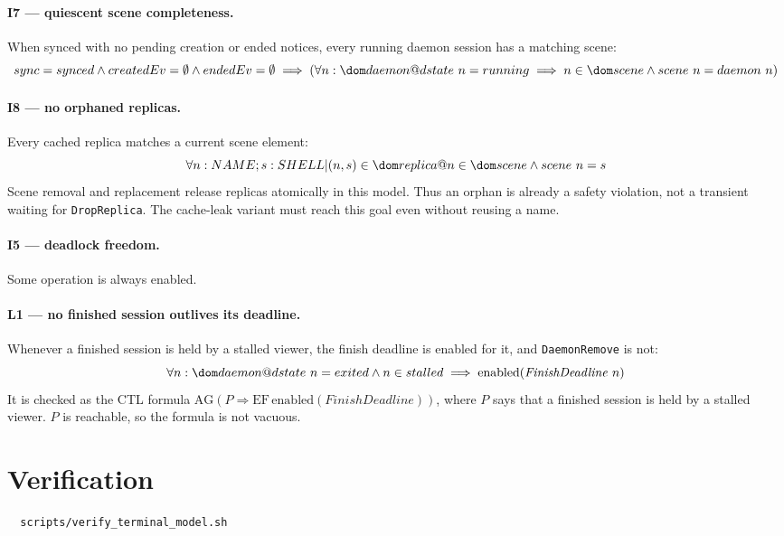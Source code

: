 \documentclass[a4paper,10pt,fleqn]{article}
\begin{document}
\paragraph{I7 --- quiescent scene completeness.}
When synced with no pending creation or ended notices, every running daemon
session has a matching scene:
\[
  sync = synced \land createdEv = \emptyset \land endedEv = \emptyset
  \implies (\forall n : \dom daemon @ dstate~n = running \implies
    n \in \dom scene \land scene~n = daemon~n)
\]

\paragraph{I8 --- no orphaned replicas.}
Every cached replica matches a current scene element:
\[
  \forall n : NAME; s : SHELL | (n , s) \in \dom replica @
    n \in \dom scene \land scene~n = s
\]
Scene removal and replacement release replicas atomically in this model.
Thus an orphan is already a safety violation, not a transient waiting for
\texttt{DropReplica}. The cache-leak variant must reach this goal even
without reusing a name.

\paragraph{I5 --- deadlock freedom.}
Some operation is always enabled.

\paragraph{L1 --- no finished session outlives its deadline.}
Whenever a finished session is held by a stalled viewer, the finish deadline
is enabled for it, and \texttt{DaemonRemove} is not:
\[
  \forall n : \dom daemon @ dstate~n = exited \land n \in stalled
    \implies \mathrm{enabled}(\mathit{FinishDeadline}~n)
\]
It is checked as the CTL formula $\mathrm{AG}(P \Rightarrow
\mathrm{EF}\,\mathrm{enabled}(\mathit{FinishDeadline}))$, where $P$ says that
a finished session is held by a stalled viewer.  $P$ is reachable, so the
formula is not vacuous.

\section{Verification}
\label{sec:verify}

\begin{verbatim}
  scripts/verify_terminal_model.sh
\end{verbatim}
\end{document}
